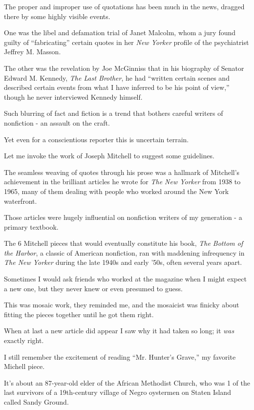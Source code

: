 \documentclass{book}
\numberwithin{equation}{section}
\begin{document}
%
The proper and improper use of quotations has been much in the news, dragged there by some highly visible events.

One was the libel and defamation trial of Janet Malcolm, whom a jury found guilty of ``fabricating'' certain quotes in her \textit{New Yorker} profile of the psychiatrist Jeffrey M. Masson.

The other was the revelation by Joe McGinniss that in his biography of Senator Edward M. Kennedy, \textit{The Last Brother}, he had ``written certain scenes and described certain events from what I have inferred to be his point of view,'' though he never interviewed Kennedy himself.

Such blurring of fact and fiction is a trend that bothers careful writers of nonfiction - an assault on the craft.

Yet even for a conscientious reporter this is uncertain terrain.

Let me invoke the work of Joseph Mitchell to suggest some guidelines.

The seamless weaving of quotes through his prose was a hallmark of Mitchell's achievement in the brilliant articles he wrote for \textit{The New Yorker} from 1938 to 1965, many of them dealing with people who worked around the New York waterfront.

Those articles were hugely influential on nonfiction writers of my generation - a primary textbook.

%
The 6 Mitchell pieces that would eventually constitute his book, \textit{The Bottom of the Harbor}, a classic of American nonfiction, ran with maddening infrequency in \textit{The New Yorker} during the late 1940s and early '50s, often several years apart.

Sometimes I would ask friends who worked at the magazine when I might expect a new one, but they never knew or even presumed to guess.

This was mosaic work, they reminded me, and the mosaicist was finicky about fitting the pieces together until he got them right.

When at last a new article did appear I saw why it had taken so long; it \textit{was} exactly right.

I still remember the excitement of reading ``Mr. Hunter's Grave,'' my favorite Michell piece.

It's about an 87-year-old elder of the African Methodist Church, who was 1 of the last survivors of a 19th-century village of Negro oystermen on Staten Island called Sandy Ground.
\end{document}
